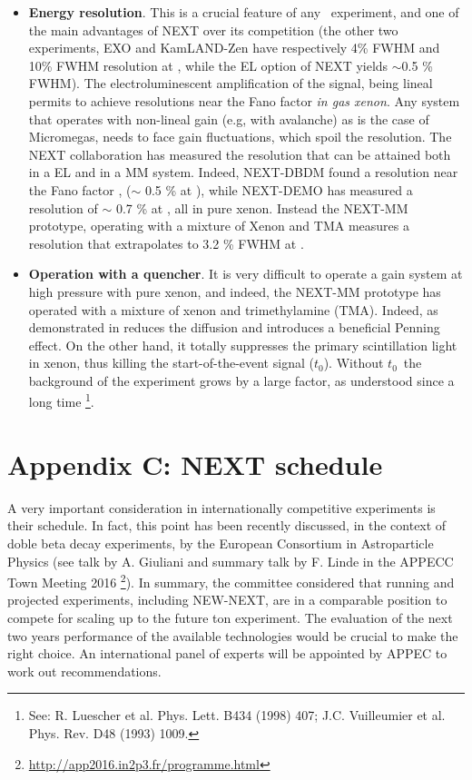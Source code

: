 \documentclass[a4paper,11pt,oneside]{article}
\begin{document}
\begin{itemize}
\item {\bf Energy resolution}. This is a crucial feature of any \bbonu\ experiment, and one of the main advantages
of NEXT over its competition (the other two experiments, EXO and KamLAND-Zen have respectively 4\% FWHM and 10\% FWHM resolution at \Qbb, while the EL option of NEXT yields $\sim$0.5 \% FWHM). The electroluminescent amplification of the signal, being lineal permits to achieve resolutions near the Fano factor {\em in gas xenon}. Any system that operates with non-lineal gain (e.g, with avalanche) as is the case of Micromegas, needs to face gain fluctuations, which spoil the resolution. The NEXT collaboration has measured the resolution that can be attained both in a EL and in a MM system. Indeed, NEXT-DBDM found a resolution near the Fano factor \cite{Alvarez:2012yxw},
($\sim$ 0.5 \% at \Qbb), while NEXT-DEMO has measured a resolution of $\sim$ 0.7 \% at \Qbb \cite{Alvarez:2012zsz, Alvarez:2013gxa, Lorca:2014sra}, all in pure xenon. Instead the NEXT-MM prototype, operating with a mixture of Xenon and TMA measures a resolution that extrapolates to 3.2 \% FWHM at \Qbb \cite{Gonzalez-Diaz:2015oba}.
\item {\bf Operation with a quencher}. It is very difficult to operate a gain system at high pressure with pure xenon, and indeed, the NEXT-MM prototype has operated with a mixture of xenon and trimethylamine (TMA). Indeed, as
demonstrated in \cite{Gonzalez-Diaz:2015oba} reduces the diffusion and introduces a beneficial Penning effect. On the other hand, it totally suppresses the primary scintillation light in xenon, thus killing the start-of-the-event signal 
($t_0$). Without $t_0$~the background of the experiment grows by a large factor, as understood since a long time
\footnote{See: R. Luescher et al. Phys. Lett. B434 (1998) 407;
J.C. Vuilleumier et al. Phys. Rev. D48 (1993) 1009.}. 
\end{itemize}

%

\section{\bf \textsf{Appendix C: NEXT schedule}}

A very important consideration in internationally competitive experiments is their schedule. In fact, this point 
has been recently discussed, in the context of doble beta decay experiments, by the European Consortium 
in Astroparticle Physics (see talk by A. Giuliani and summary talk by F. Linde in the APPECC Town Meeting 
2016 \footnote{\url{
http://app2016.in2p3.fr/programme.html}}). In summary, the committee considered that running and projected experiments, including NEW-NEXT,  
are in a comparable position to compete for scaling up to the future ton experiment. The evaluation of the next two 
years performance of the available technologies would be crucial to make the right choice. An international 
panel of experts will be appointed by APPEC to work out recommendations.
\end{document}

